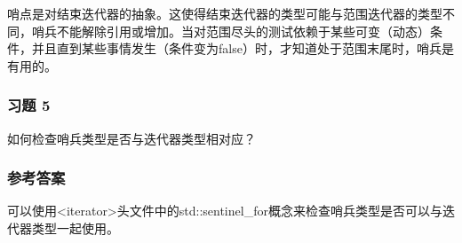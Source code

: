 哨点是对结束迭代器的抽象。这使得结束迭代器的类型可能与范围迭代器的类型不同，哨兵不能解除引用或增加。当对范围尽头的测试依赖于某些可变（动态）条件，并且直到某些事情发生（条件变为false）时，才知道处于范围末尾时，哨兵是有用的。

\subsubsection{习题 5}

如何检查哨兵类型是否与迭代器类型相对应？

\subsubsection{参考答案}

可以使用<iterator>头文件中的std::sentinel\_for概念来检查哨兵类型是否可以与迭代器类型一起使用。












